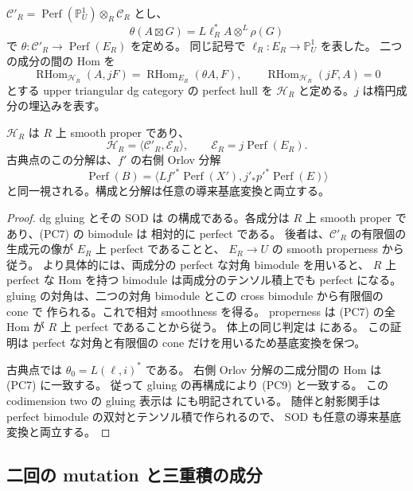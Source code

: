 $\mathcal C'_R=\operatorname{Perf}(\mathbb P^1_U)\otimes_R\mathcal C_R$ とし、
\[
 \theta(A\boxtimes G)=L\ell_R^*A\otimes^L\rho(G)
 \tag{PC6}
\]
で $\theta:\mathcal C'_R\to\operatorname{Perf}(E_R)$ を定める。
同じ記号で $\ell_R:E_R\to\mathbb P^1_U$ を表した。
二つの成分の間の Hom を
\[
 \operatorname{RHom}_{\mathcal H_R}(A,jF)
 =\operatorname{RHom}_{E_R}(\theta A,F),\qquad
 \operatorname{RHom}_{\mathcal H_R}(jF,A)=0
 \tag{PC7}
\]
とする upper triangular dg category の perfect hull を
$\mathcal H_R$ と定める。$j$ は楕円成分の埋込みを表す。

\begin{lemma}\label{pcat:gluing}
$\mathcal H_R$ は $R$ 上 smooth proper であり、
\[
 \mathcal H_R=\langle\mathcal C'_R,\mathcal E_R\rangle,
 \qquad \mathcal E_R=j\operatorname{Perf}(E_R).
 \tag{PC8}
\]
古典点のこの分解は、$f'$ の右側 Orlov 分解
\[
 \operatorname{Perf}(B)
 =\langle Lf'^*\operatorname{Perf}(X'),j'_*p'^*\operatorname{Perf}(E)\rangle
 \tag{PC9}
\]
と同一視される。構成と分解は任意の導来基底変換と両立する。
\end{lemma}

\begin{proof}
dg gluing とその SOD は \cite[定義3.4--3.5、命題3.7--3.8]{PencilOrlovGluing}
の構成である。各成分は $R$ 上 smooth proper であり、(PC7) の bimodule は
相対的に perfect である。
後者は、$\mathcal C'_R$ の有限個の生成元の像が $E_R$ 上 perfect であることと、
$E_R\to U$ の smooth properness から従う。
より具体的には、両成分の perfect な対角 bimodule を用いると、
$R$ 上 perfect な Hom を持つ bimodule は両成分のテンソル積上でも perfect になる。
gluing の対角は、二つの対角 bimodule とこの cross bimodule から有限個の cone で
作られる。これで相対 smoothness を得る。
properness は (PC7) の全 Hom が $R$ 上 perfect であることから従う。
体上の同じ判定は \cite[命題3.22、定理3.25]{PencilOrlovGluing} にある。
この証明は perfect な対角と有限個の cone だけを用いるため基底変換を保つ。

古典点では $\theta_0=L(\ell,i)^*$ である。
右側 Orlov 分解の二成分間の Hom は (PC7) に一致する。
従って gluing の再構成により (PC9) と一致する。
この codimension two の gluing 表示は
\cite[例3.10]{PencilOrlovGluing} にも明記されている。
随伴と射影関手は perfect bimodule の双対とテンソル積で作られるので、
SOD も任意の導来基底変換と両立する。
\end{proof}

\subsection{二回の mutation と三重積の成分}

